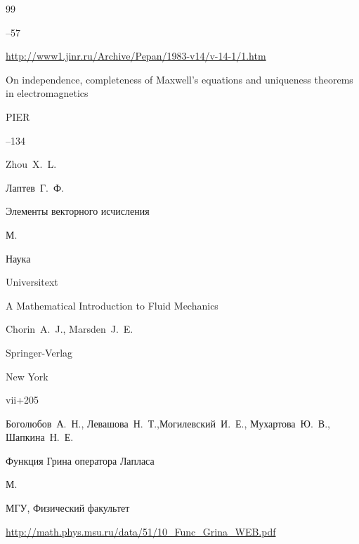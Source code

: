 \begin{thebibliography}{99}



--57

\elink \url{http://www1.jinr.ru/Archive/Pepan/1983-v14/v-14-1/1.htm}





\paper On independence, completeness of Maxwell's equations and uniqueness theorems in electromagnetics 

\jour PIER



--134

\by Zhou~X.~L. 




\by Лаптев~Г.~Ф.

\book Элементы векторного исчисления

\publaddr М.

\publ Наука






\serial Universitext


\book A Mathematical Introduction to Fluid Mechanics

\by  Chorin~A.~J.,  Marsden~J.~E. 

\publ Springer-Verlag 

\publaddr New York

\totalpages vii+205





\by Боголюбов~А.~Н., Левашова~Н.~Т.,Могилевский~И.~Е., Мухартова~Ю.~В., Шапкина~Н.~Е.

\book Функция Грина оператора Лапласа

\publaddr М.

\publ МГУ, Физический факультет



\elink 

\url{http://math.phys.msu.ru/data/51/10_Func_Grina_WEB.pdf} 




\end{thebibliography}
